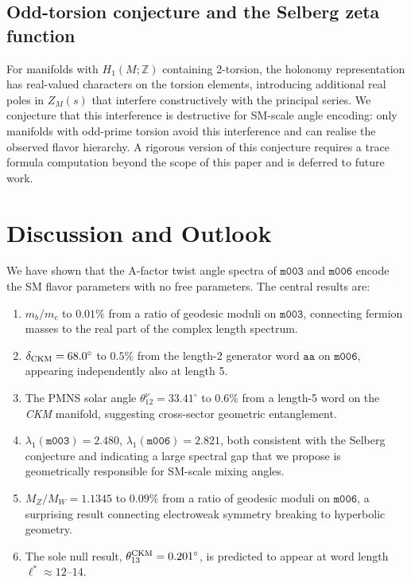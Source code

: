 \documentclass[11pt,a4paper]{article}
\newcommand{\mfld}[1]{\texttt{#1}}
\newcommand{\word}[1]{\texttt{#1}}
\newcommand{\degr}{^{\circ}}
\begin{document}
\subsection{Odd-torsion conjecture and the Selberg zeta function}

For manifolds with $H_1(M;\mathbb{Z})$ containing 2-torsion, the holonomy
representation has real-valued characters on the torsion elements, introducing
additional real poles in $Z_M(s)$ that interfere constructively with the
principal series.
We conjecture that this interference is destructive for SM-scale angle
encoding: only manifolds with odd-prime torsion avoid this interference and
can realise the observed flavor hierarchy.
A rigorous version of this conjecture requires a trace formula computation
beyond the scope of this paper and is deferred to future work.

\section{Discussion and Outlook}
\label{sec:discussion}

We have shown that the A-factor twist angle spectra of $\mfld{m003}$ and
$\mfld{m006}$ encode the SM flavor parameters with no free parameters.
The central results are:

\begin{enumerate}
\item $m_b/m_c$ to $0.01\%$ from a ratio of geodesic moduli on $\mfld{m003}$,
      connecting fermion masses to the real part of the complex length spectrum.
\item $\delta_{\rm CKM}=68.0\degr$ to $0.5\%$ from the length-2 generator word
      $\word{aa}$ on $\mfld{m006}$, appearing independently also at length 5.
\item The PMNS solar angle $\theta_{12}^\nu=33.41\degr$ to $0.6\%$ from a
      length-5 word on the \emph{CKM} manifold, suggesting cross-sector
      geometric entanglement.
\item $\lambda_1(\mfld{m003})=2.480$, $\lambda_1(\mfld{m006})=2.821$,
      both consistent with the Selberg conjecture and indicating a large
      spectral gap that we propose is geometrically responsible for
      SM-scale mixing angles.
\item $M_Z/M_W=1.1345$ to $0.09\%$ from a ratio of geodesic moduli on
      $\mfld{m006}$, a surprising result connecting electroweak symmetry
      breaking to hyperbolic geometry.
\item The sole null result, $\theta_{13}^{\rm CKM}=0.201\degr$, is predicted
      to appear at word length $\ell^*\approx 12$--$14$.
\end{enumerate}
\end{document}
